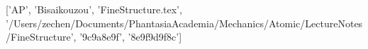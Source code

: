 ['AP', 'Bisaikouzou', 'FineStructure.tex', '/Users/zechen/Documents/PhantasiaAcademia/Mechanics/Atomic/LectureNotes/FineStructure', '\x9c\xba{}\xad{}\x9a\x8e\x9f\xad{}', '\x8e\x9f\xad{}\x9d\x9f\x8c\xaf']
